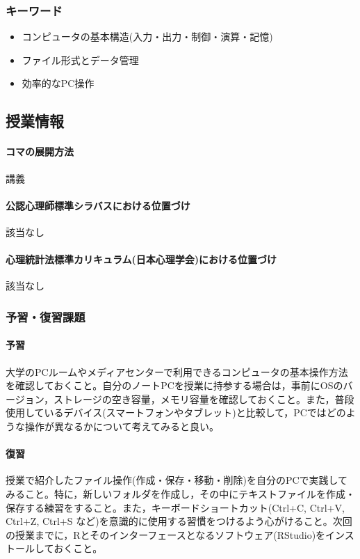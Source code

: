 \subsubsection{キーワード}
\begin{itemize}
	\item コンピュータの基本構造(入力・出力・制御・演算・記憶)
	\item ファイル形式とデータ管理
	\item 効率的なPC操作
\end{itemize}
\subsection{授業情報}
\paragraph{コマの展開方法}
講義
\paragraph{公認心理師標準シラバスにおける位置づけ}
該当なし
\paragraph{心理統計法標準カリキュラム(日本心理学会)における位置づけ}
該当なし
\subsubsection{予習・復習課題}
\paragraph{予習}
大学のPCルームやメディアセンターで利用できるコンピュータの基本操作方法を確認しておくこと。自分のノートPCを授業に持参する場合は，事前にOSのバージョン，ストレージの空き容量，メモリ容量を確認しておくこと。また，普段使用しているデバイス(スマートフォンやタブレット)と比較して，PCではどのような操作が異なるかについて考えてみると良い。
\paragraph{復習}
授業で紹介したファイル操作(作成・保存・移動・削除)を自分のPCで実践してみること。特に，新しいフォルダを作成し，その中にテキストファイルを作成・保存する練習をすること。また，キーボードショートカット(Ctrl+C, Ctrl+V, Ctrl+Z, Ctrl+S など)を意識的に使用する習慣をつけるよう心がけること。次回の授業までに，Rとそのインターフェースとなるソフトウェア(RStudio)をインストールしておくこと。
